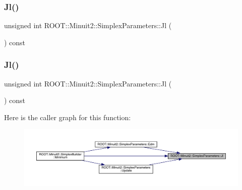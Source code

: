 \subsubsection{\texorpdfstring{Jl()}{Jl()}\hspace{0.1cm}{\footnotesize\ttfamily [1/3]}}
{\footnotesize\ttfamily unsigned int R\+O\+O\+T\+::\+Minuit2\+::\+Simplex\+Parameters\+::\+Jl (\begin{DoxyParamCaption}{ }\end{DoxyParamCaption}) const\hspace{0.3cm}{\ttfamily [inline]}}

\mbox{\label{classROOT_1_1Minuit2_1_1SimplexParameters_accfb7ec2b1087661ed3c31dfbb473413}} 
\subsubsection{\texorpdfstring{Jl()}{Jl()}\hspace{0.1cm}{\footnotesize\ttfamily [2/3]}}
{\footnotesize\ttfamily unsigned int R\+O\+O\+T\+::\+Minuit2\+::\+Simplex\+Parameters\+::\+Jl (\begin{DoxyParamCaption}{ }\end{DoxyParamCaption}) const\hspace{0.3cm}{\ttfamily [inline]}}

Here is the caller graph for this function\+:
\nopagebreak
\begin{figure}[H]
\begin{center}
\leavevmode
\includegraphics[width=350pt]{d7/da2/classROOT_1_1Minuit2_1_1SimplexParameters_accfb7ec2b1087661ed3c31dfbb473413_icgraph}
\end{center}
\end{figure}
\mbox{\label{classROOT_1_1Minuit2_1_1SimplexParameters_accfb7ec2b1087661ed3c31dfbb473413}} 
